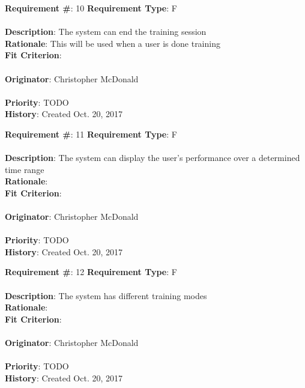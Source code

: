 \documentclass[11pt]{article}
\begin{document}
\begin{framed}
	\noindent\textbf{Requirement \#}: 10 \hfill \textbf{Requirement Type}: F \hfill\\\\
	\noindent\textbf{Description}: The system can end the training session \\
	\textbf{Rationale}: This will be used when a user is done training \\
	\textbf{Fit Criterion}: \\\\
	\textbf{Originator}: Christopher McDonald \\\\
	\textbf{Priority}: TODO \hfill \\
	\noindent\textbf{History}: Created Oct. 20, 2017
\end{framed}

\begin{framed}
	\noindent\textbf{Requirement \#}: 11 \hfill \textbf{Requirement Type}: F \hfill\\\\
	\noindent\textbf{Description}: The system can display the user's performance over a determined time range \\
	\textbf{Rationale}: \\
	\textbf{Fit Criterion}: \\\\
	\textbf{Originator}: Christopher McDonald \\\\
	\textbf{Priority}: TODO \hfill \\
	\noindent\textbf{History}: Created Oct. 20, 2017
\end{framed}

\begin{framed}
	\noindent\textbf{Requirement \#}: 12 \hfill \textbf{Requirement Type}: F \hfill\\\\
	\noindent\textbf{Description}: The system has different training modes \\
	\textbf{Rationale}: \\
	\textbf{Fit Criterion}: \\\\
	\textbf{Originator}: Christopher McDonald \\\\
	\textbf{Priority}: TODO \hfill \\
	\noindent\textbf{History}: Created Oct. 20, 2017
\end{framed}
\end{document}
